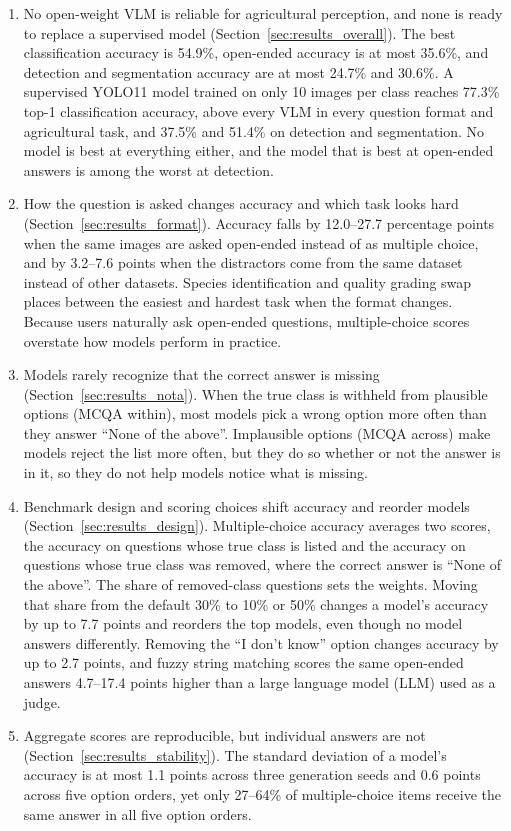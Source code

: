 \documentclass[10pt,letterpaper]{article}
\begin{document}
\begin{enumerate}
    \item No open-weight VLM is reliable for agricultural perception, and none is ready to replace a supervised model (Section~\ref{sec:results_overall}). The best classification accuracy is 54.9\%, open-ended accuracy is at most 35.6\%, and detection and segmentation accuracy are at most 24.7\% and 30.6\%. A supervised YOLO11 model trained on only 10 images per class reaches 77.3\% top-1 classification accuracy, above every VLM in every question format and agricultural task, and 37.5\% and 51.4\% on detection and segmentation. No model is best at everything either, and the model that is best at open-ended answers is among the worst at detection.
    \item How the question is asked changes accuracy and which task looks hard (Section~\ref{sec:results_format}). Accuracy falls by 12.0--27.7 percentage points when the same images are asked open-ended instead of as multiple choice, and by 3.2--7.6 points when the distractors come from the same dataset instead of other datasets. Species identification and quality grading swap places between the easiest and hardest task when the format changes. Because users naturally ask open-ended questions, multiple-choice scores overstate how models perform in practice.
    \item Models rarely recognize that the correct answer is missing (Section~\ref{sec:results_nota}). When the true class is withheld from plausible options (MCQA within), most models pick a wrong option more often than they answer ``None of the above''. Implausible options (MCQA across) make models reject the list more often, but they do so whether or not the answer is in it, so they do not help models notice what is missing.
    \item Benchmark design and scoring choices shift accuracy and reorder models (Section~\ref{sec:results_design}). Multiple-choice accuracy averages two scores, the accuracy on questions whose true class is listed and the accuracy on questions whose true class was removed, where the correct answer is ``None of the above''. The share of removed-class questions sets the weights. Moving that share from the default 30\% to 10\% or 50\% changes a model's accuracy by up to 7.7 points and reorders the top models, even though no model answers differently. Removing the ``I don't know'' option changes accuracy by up to 2.7 points, and fuzzy string matching scores the same open-ended answers 4.7--17.4 points higher than a large language model (LLM) used as a judge.
    \item Aggregate scores are reproducible, but individual answers are not (Section~\ref{sec:results_stability}). The standard deviation of a model's accuracy is at most 1.1 points across three generation seeds and 0.6 points across five option orders, yet only 27--64\% of multiple-choice items receive the same answer in all five option orders.
\end{enumerate}
\end{document}
